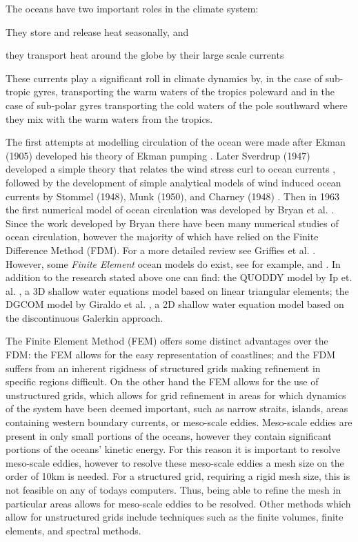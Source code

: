 The oceans have two important roles in the climate system:
\begin{inparaenum}[1)]\item They store and release heat seasonally, and \item
they transport heat around the globe by their large scale currents
\end{inparaenum} These currents play a significant roll in climate dynamics
by, in the case of sub-tropic gyres, transporting the warm waters of the
tropics poleward and in the case of sub-polar gyres transporting the cold
waters of the pole southward where they mix with the warm waters from the
tropics.

The first attempts at modelling circulation of the ocean were made after Ekman
(1905) developed his theory of Ekman pumping \cite{Ekman1905}. Later Sverdrup
(1947) developed a simple theory that relates the wind stress curl to ocean
currents \cite{Sverdrup1947}, followed by the development of simple analytical
models of wind induced ocean currents by Stommel (1948), Munk (1950), and
Charney (1948) \cite{Stommel1948,Munk1950,Charney1948}. Then in 1963 the first
numerical model of ocean circulation was developed by Bryan et al.
\cite{Bryan1963}. Since the work developed by Bryan there have been many
numerical studies of ocean circulation, however the majority of which have
relied on the Finite Difference Method (FDM). For a more detailed review see
Griffies et al. \cite{Griffies2000}. However, some \emph{Finite Element} ocean
models do exist, see for example, \cite{Fix} and \cite{Myers}. In addition to
the research stated above one can find: the QUODDY model by Ip et. al.
\cite{Ip1995}, a 3D shallow water equations model based on linear triangular
elements; the DGCOM model by Giraldo et al. \cite{GiraldoWWW}, a 2D shallow
water equation model based on the discontinuous Galerkin approach.

The Finite Element Method (FEM) offers some distinct advantages over the FDM:
the FEM allows for the easy representation of coastlines; and the FDM suffers
from an inherent rigidness of structured grids making refinement in specific
regions difficult. On the other hand the FEM allows for the use of
unstructured grids, which allows for grid refinement in areas for which
dynamics of the system have been deemed important, such as narrow straits,
islands, areas containing western boundary currents, or meso-scale eddies.
Meso-scale eddies are present in only small portions of the oceans, however
they contain significant portions of the oceans' kinetic energy. For this
reason it is important to resolve meso-scale eddies, however to resolve these
meso-scale eddies a mesh size on the order of 10km is needed. For a structured
grid, requiring a rigid mesh size, this is not feasible on any of todays
computers. Thus, being able to refine the mesh in particular areas allows for
meso-scale eddies to be resolved. Other methods which allow for unstructured
grids include techniques such as the finite volumes, finite elements, and
spectral methods. 

